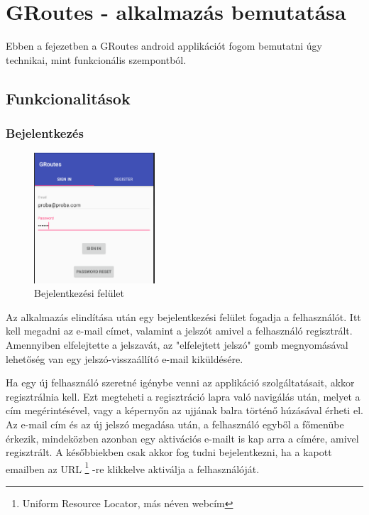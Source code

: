 \chapter{GRoutes - alkalmazás bemutatása}\label{ch:ALAP}

\begin{osszefoglal}
	Ebben a fejezetben a GRoutes android applikációt fogom bemutatni úgy technikai, mint funkcionális szempontból.
	
\end{osszefoglal}

\section{Funkcionalitások}\label{sec:ALAP:adatelem}

\subsection{Bejelentkezés}

\begin{figure}
	\centering
	\setlength{\abovecaptionskip}{0pt}
	\setlength{\belowcaptionskip}{0pt}
	\includegraphics[width=0.4\textwidth]{images/login}
	\caption{Bejelentkezési felület\label{fig:ALAP:sm2}}
\end{figure}

Az alkalmazás elindítása után egy bejelentkezési felület fogadja a felhasználót. Itt kell megadni az e-mail címet, valamint a jelszót amivel a felhasználó regisztrált. Amennyiben elfelejtette a jelszavát, az "elfelejtett jelszó" gomb megnyomásával lehetőség van egy jelszó-visszaállító e-mail kiküldésére. 

Ha egy új felhasználó szeretné igénybe venni az applikáció szolgáltatásait, akkor regisztrálnia kell. Ezt megteheti a regisztráció lapra való navigálás után, melyet a cím megérintésével, vagy a képernyőn az ujjának balra történő húzásával érheti el. Az e-mail cím és az új jelszó megadása után, a felhasználó egyből a főmenübe érkezik, mindeközben azonban egy aktivációs e-mailt is kap arra a címére, amivel regisztrált. A későbbiekben csak akkor fog tudni bejelentkezni, ha a kapott emailben az URL%
\footnote{ %
	Uniform Resource Locator, más néven webcím
}  %
-re klikkelve aktiválja a felhasználóját.

